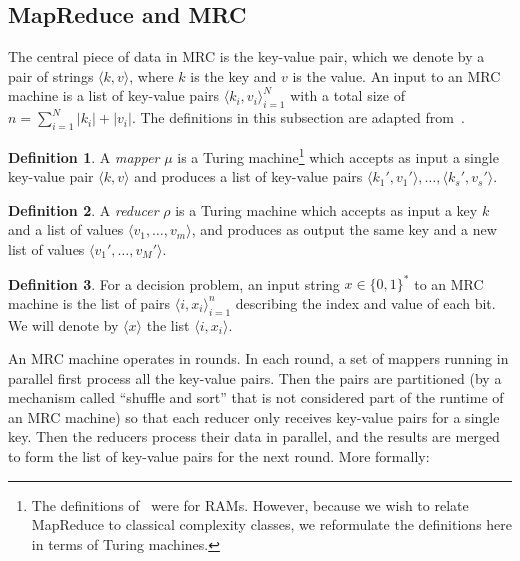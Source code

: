 \documentclass[11pt]{article}
\theoremstyle{definition}
\newtheorem{defn}{Definition}
\theoremstyle{remark}
\begin{document}
\subsection{MapReduce and MRC}

The central piece of data in MRC is the key-value pair, which we denote by a
pair of strings $\langle k, v \rangle$, where $k$ is the key and $v$ is the
value. An input to an MRC machine is a list of key-value pairs $\langle k_i,
v_i \rangle_{i=1}^N$ with a total size of $n = \sum_{i=1}^N |k_i| + |v_i|$.
The definitions in this subsection are adapted from~\cite{Karloff10}.

\begin{defn}
A \emph{mapper} $\mu$ is a Turing machine\footnote{The definitions
of~\cite{Karloff10} were for RAMs. However, because we wish to relate MapReduce
to classical complexity classes, we reformulate the definitions here in terms
of Turing machines.} which accepts as input a single key-value pair $\langle k,
v \rangle$ and produces a list of key-value pairs $\langle k_1', v_1' \rangle,
\dots, \langle k_s', v_s' \rangle$. \end{defn}

\begin{defn}
A \emph{reducer} $\rho$ is a Turing machine which accepts as input a key $k$
and a list of values $\langle v_1 , \dots, v_m \rangle$, and produces as output
the same key and a new list of values $\langle v_1', \dots, v_M' \rangle$.
\end{defn}

\begin{defn}
For a decision problem, an input string $x \in \{ 0,1 \}^*$ to an MRC machine
is the list of pairs $\langle i, x_i \rangle_{i=1}^n$ describing the index
and value of each bit. We will denote by $\langle x \rangle$ the list $\langle
i, x_i \rangle$.
\end{defn}

An MRC machine operates in rounds. In each round, a set of mappers running in
parallel first process all the key-value pairs. Then the pairs are partitioned
(by a mechanism called ``shuffle and sort'' that is not considered part of the
runtime of an MRC machine) so that each reducer only receives key-value pairs
for a single key. Then the reducers process their data in parallel, and the
results are merged to form the list of key-value pairs for the next round. More
formally:
\end{document}

